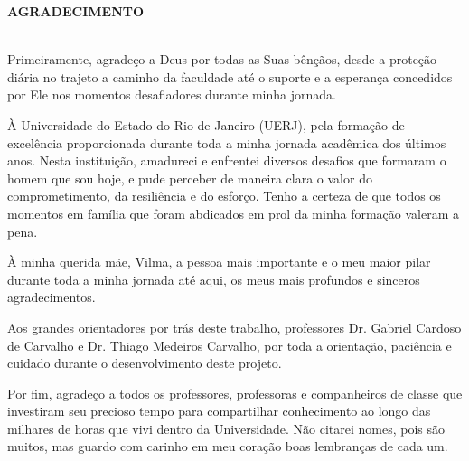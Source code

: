 \begin{center}
\textbf{AGRADECIMENTO}
\end{center}

$\!$\\
Primeiramente, agradeço a Deus por todas as Suas bênçãos, desde a proteção diária no trajeto a caminho da faculdade até o suporte e a esperança concedidos por Ele nos momentos desafiadores durante minha jornada.

À Universidade do Estado do Rio de Janeiro (UERJ), pela formação de excelência proporcionada durante toda a minha jornada acadêmica dos últimos anos. Nesta instituição, amadureci e enfrentei diversos desafios que formaram o homem que sou hoje, e pude perceber de maneira clara o valor do comprometimento, da resiliência e do esforço. Tenho a certeza de que todos os momentos em família que foram abdicados em prol da minha formação valeram a pena.

À minha querida mãe, Vilma, a pessoa mais importante e o meu maior pilar durante toda a minha jornada até aqui, os meus mais profundos e sinceros agradecimentos.

Aos grandes orientadores por trás deste trabalho, professores Dr. Gabriel Cardoso de Carvalho e Dr. Thiago Medeiros Carvalho, por toda a orientação, paciência e cuidado durante o desenvolvimento deste projeto.

Por fim, agradeço a todos os professores, professoras e companheiros de classe que investiram seu precioso tempo para compartilhar conhecimento ao longo das milhares de horas que vivi dentro da Universidade. Não citarei nomes, pois são muitos, mas guardo com carinho em meu coração boas lembranças de cada um.